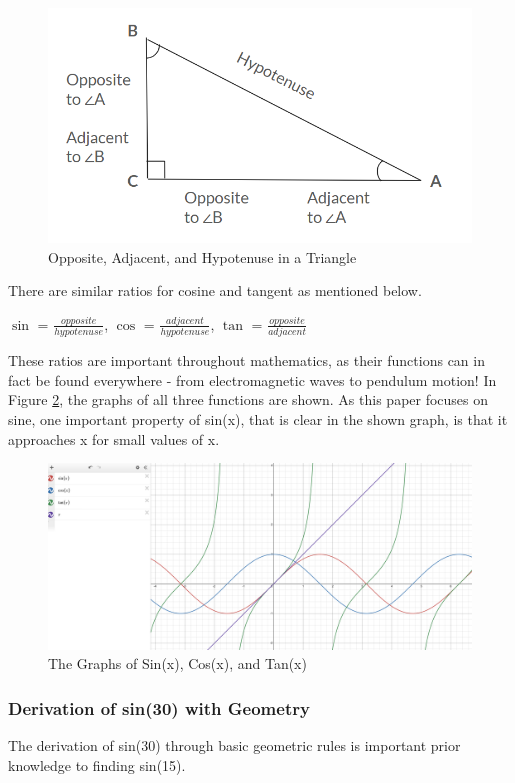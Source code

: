 \documentclass[12pt]{article}
\begin{document}
\begin{figure}[h]
    \centering
    \includegraphics[width=0.5\linewidth]{OppAdjHyp.png}
    \caption{Opposite, Adjacent, and Hypotenuse in a Triangle}
    \label{fig:OHA}
\end{figure}

There are similar ratios for cosine and tangent as mentioned below. 
\begin{center}
    $\sin$ = $\frac{opposite}{hypotenuse}$,  $\cos$ = $\frac{adjacent}{hypotenuse}$, $\tan$ = $\frac{opposite}{adjacent}$
\end{center}

These ratios are important throughout mathematics, as their functions can in fact be found everywhere - from electromagnetic waves to pendulum motion! In Figure \ref{fig:sct}, the graphs of all three functions are shown. As this paper focuses on sine, one important property of sin(x), that is clear in the shown graph, is that it approaches x for small values of x. 

\begin{figure}[h]
    \centering
    \includegraphics[width=0.8\linewidth]{sincostangraphs.png}
    \caption{The Graphs of Sin(x), Cos(x), and Tan(x)}
    \label{fig:sct}
\end{figure}            

\subsubsection{Derivation of sin(30) with Geometry}
The derivation of sin(30) through basic geometric rules is important prior knowledge to finding sin(15).
\end{document}
